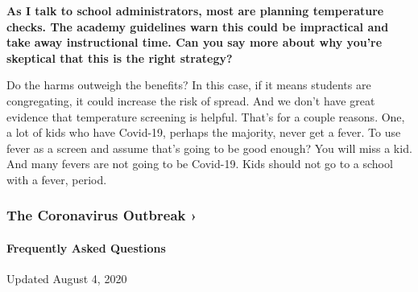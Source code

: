 \textbf{As I talk to school administrators, most are planning
temperature checks. The academy guidelines warn this could be
impractical and take away instructional time. Can you say more about why
you're skeptical that this is the right strategy?}

Do the harms outweigh the benefits? In this case, if it means students
are congregating, it could increase the risk of spread. And we don't
have great evidence that temperature screening is helpful. That's for a
couple reasons. One, a lot of kids who have Covid-19, perhaps the
majority, never get a fever. To use fever as a screen and assume that's
going to be good enough? You will miss a kid. And many fevers are not
going to be Covid-19. Kids should not go to a school with a fever,
period.

\href{https://www.nytimes3xbfgragh.onion/news-event/coronavirus?action=click\&pgtype=Article\&state=default\&region=MAIN_CONTENT_3\&context=storylines_faq}{}

\hypertarget{the-coronavirus-outbreak-}{%
\subsubsection{The Coronavirus Outbreak
›}\label{the-coronavirus-outbreak-}}

\hypertarget{frequently-asked-questions}{%
\paragraph{Frequently Asked
Questions}\label{frequently-asked-questions}}

Updated August 4, 2020

